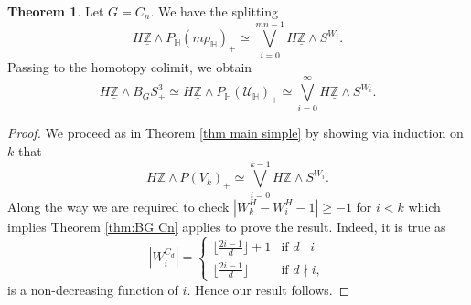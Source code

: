 \documentclass[a4paper,leqno,11pt]{amsart}
\theoremstyle{plain}
\theoremstyle{definition}
\newtheorem{thm}[theorem]{Theorem}
\theoremstyle{remark}
\theoremstyle{definition}
\newcommand{\Hyp}{{\mathbb H}}
\newcommand\UU{{\mathcal U}}
\newcommand{\uZ}{\underline{\mathbb{Z}}}
\numberwithin{equation}{section}
\newcommand{\smas}{\wedge}
\begin{document}
	\begin{thm}\label{quatadd}
Let $G =C_n$. We have the splitting 
$$H\uZ \smas P_{\mathbb H}(m\rho_\Hyp)_+ \simeq \bigvee_{i=0}^{mn-1}H\uZ\smas S^{W_i}.$$
Passing to the homotopy colimit, we obtain 
 $$H\uZ\smas B_GS^3_+ \simeq H\uZ \smas P_{\mathbb H}(\UU_\Hyp)_+ \simeq \bigvee_{i=0}^{\infty}H\uZ\smas S^{W_i}.$$
	\end{thm}
	
	\begin{proof}
		We proceed as in Theorem \ref{thm main simple} by showing via induction on $k$ that 
		$$H\uZ\smas P(V_{k})_+\simeq \bigvee_{i=0}^{k-1}H\uZ\smas S^{W_{i}}.$$
		Along the way we are required to check $|W_{k}^{H} - W_{i}^{H} - 1|\geq -1 $ for $i<k$ which implies Theorem \ref{thm:BG Cn} applies to prove the result. Indeed, it is true as 
\[|W_{i}^{C_d}|=\begin{cases} \lfloor{\frac{2i-1}{d}}\rfloor +1 & \mbox{if } d\mid i \\ 
                        \lfloor{\frac{2i-1}{d}}\rfloor &\mbox{if } d \nmid i, \end{cases}\]
 is a non-decreasing function of $i$. Hence our result follows.  
	\end{proof}
	
\end{document}
